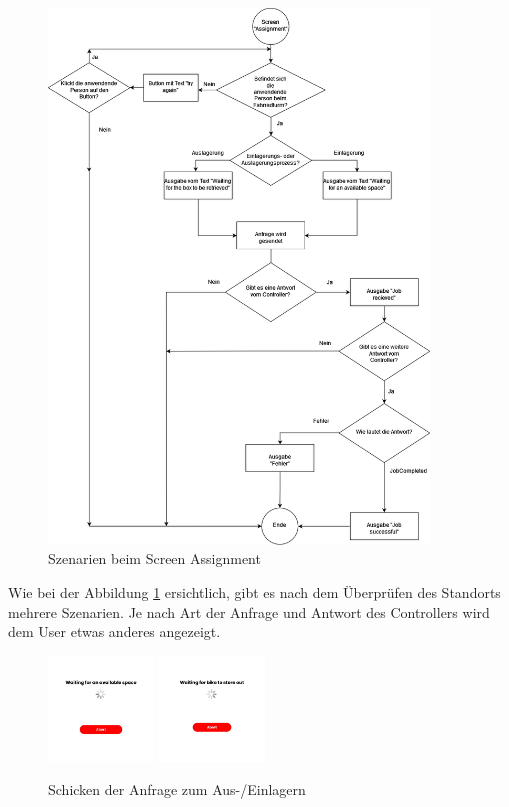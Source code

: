 \begin{figure}[H]
  \centering
  \includegraphics[width=0.9\textwidth]{images/assignmentdiagramm.png}
  \caption{Szenarien beim Screen Assignment}
  \label{fig:assignmentsze}
\end{figure}

\clearpage



Wie bei der Abbildung \ref*{fig:assignmentsze} ersichtlich, gibt es nach dem Überprüfen des Standorts mehrere Szenarien. Je nach Art der Anfrage und Antwort des Controllers wird dem User etwas anderes angezeigt.

\begin{figure}[H]
  \centering
  \includegraphics[width=0.25\textwidth]{images/app-screenshots/waitinga.png}
  \includegraphics[width=0.25\textwidth]{images/app-screenshots/waitingb.png}
  \caption{Schicken der Anfrage zum Aus-/Einlagern}
  \label{fig:screenwaiting}
\end{figure}


